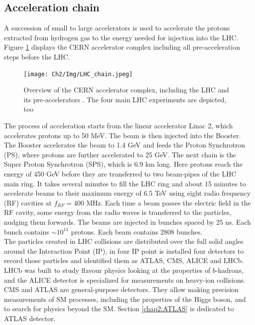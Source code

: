 \subsection{Acceleration chain}
\label{chap2:LHC:chain}
A succession of small to large accelerators is used to accelerate the protons extracted from hydrogen gas to the energy needed for injection into the LHC. Figure \ref{fig:chap2:LHC:chain} displays the CERN accelerator complex including all pre-acceleration steps before the LHC. 
\begin{figure}[htbp]
    \centering
    \texttt{[image: Ch2/Img/LHC\_chain.jpeg]}
    \caption{Overview of the CERN accelerator complex, including the LHC and its pre-accelerators \cite{LHC_chain}. The four main LHC experiments are depicted, too}
    \label{fig:chap2:LHC:chain}
\end{figure}
The process of acceleration starts from the linear accelerator Linac 2, which accelerates protons up to 50 MeV. The beam is then injected into the Booster. The Booster accelerates the beam to 1.4 GeV and feeds the Proton Synchrotron (PS), where protons are further accelerated to 25 GeV. The next chain is the Super Proton Synchrotron (SPS), which is 6.9 km long. Here protons reach the energy of 450 GeV before they are transferred to two beam-pipes of the LHC main ring. It takes several minutes to fill the LHC ring and about 15 minutes to accelerate beams to their maximum energy of 6.5 TeV using eight radio frequency (RF) cavities at $f_{RF} = 400$ MHz. Each time a beam passes the electric field in the RF cavity, some energy from the radio waves is transferred to the particles, nudging them forwards. The beams are injected in bunches spaced by 25 ns. Each bunch contains $\sim 10^{11}$ protons. Each beam contains 2808 bunches. \\
The particles created in LHC collisions are distributed over the full solid angles around the Interaction Point (IP), in four IP point is installed four detectors to record those particles and identified them as ATLAS, CMS, ALICE and LHCb. LHCb was built to study flavour physics looking at the properties of $b$-hadrons, and the ALICE detector is specialized for measurements on heavy-ion collisions. CMS and ATLAS are general-purpose detectors. They allow making precision measurements of SM processes, including the properties of the Higgs boson, and to search for physics beyond the SM. Section \ref{chap2:ATLAS} is dedicated to ATLAS detector.

